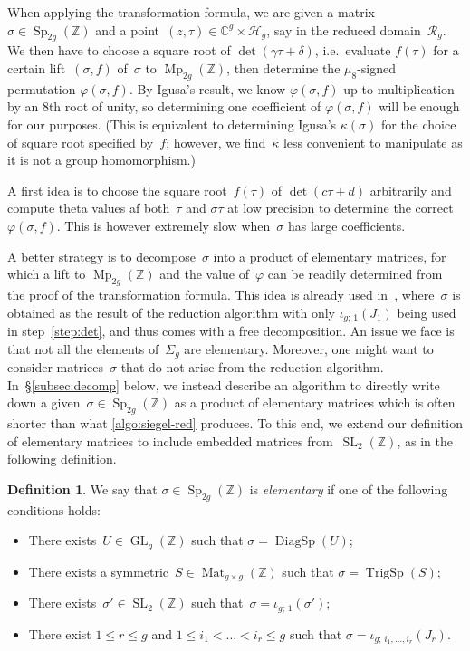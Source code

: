 \documentclass[12pt,oneside]{amsart}
\numberwithin{equation}{section}
\theoremstyle{definition}
\newtheorem{defn}[equation]{Definition}
\newcommand{\Z}{\mathbb{Z}}
\newcommand{\red}{\mathcal{R}}
\newcommand{\C}{\mathbb{C}}
\newcommand{\Half}{\mathcal{H}}
\renewcommand{\phi}{\varphi}
\newcommand{\embedsp}[2]{\iota_{#1;\,#2}}
\DeclareMathOperator{\Sp}{Sp}
\DeclareMathOperator{\SL}{SL}
\DeclareMathOperator{\GL}{GL}
\DeclareMathOperator{\Mp}{Mp}
\DeclareMathOperator{\Mat}{Mat}
\DeclareMathOperator{\TrigSp}{TrigSp}
\DeclareMathOperator{\DiagSp}{DiagSp}
\begin{document}
When applying the transformation formula, we are given a
matrix~$\sigma\in \Sp_{2g}(\Z)$ and a point~$(z,\tau)\in \C^g\times\Half_g$,
say in the reduced domain~$\red_g$. We then have to choose a square root of
$\det(\gamma\tau + \delta)$, i.e.~evaluate $f(\tau)$ for a certain
lift~$(\sigma,f)$ of~$\sigma$ to $\Mp_{2g}(\Z)$, then determine the
$\mu_8$-signed permutation $\phi(\sigma,f)$.  By Igusa's result, we know
$\phi(\sigma,f)$ up to multiplication by an $8$th root of unity, so determining
one coefficient of $\phi(\sigma,f)$ will be enough for our purposes. (This is
equivalent to determining Igusa's $\kappa(\sigma)$ for the choice of square
root specified by~$f$; however, we find~$\kappa$ less convenient to manipulate
as it is not a group homomorphism.)

A first idea is to choose the square root~$f(\tau)$ of $\det(c\tau + d)$
arbitrarily and compute theta values af both~$\tau$ and $\sigma\tau$ at low
precision to determine the correct $\phi(\sigma,f)$. This is however extremely
slow when~$\sigma$ has large coefficients.

A better strategy is to decompose~$\sigma$ into a product of elementary
matrices, for which a lift to $\Mp_{2g}(\Z)$ and the value of~$\phi$ can be
readily determined from the proof of the transformation formula. This idea is
already used in~\cite[§7]{deconinckComputingRiemannTheta2004}, where~$\sigma$
is obtained as the result of the reduction algorithm with only
$\embedsp{g}{1}(J_1)$ being used in step~\eqref{step:det}, and thus comes with
a free decomposition. An issue we face is that not all the elements
of~$\Sigma_g$ are elementary. Moreover, one might want to consider
matrices~$\sigma$ that do not arise from the reduction
algorithm. In~§\ref{subsec:decomp} below, we instead describe an algorithm to
directly write down a given~$\sigma\in \Sp_{2g}(\Z)$ as a product of elementary
matrices which is often shorter than what \cref{algo:siegel-red} produces. To
this end, we extend our definition of elementary matrices to include embedded
matrices from~$\SL_2(\Z)$, as in the following definition.

\begin{defn}
  \label{defn:elementary}
  We say that $\sigma\in \Sp_{2g}(\Z)$ is \emph{elementary} if one of the following conditions holds:
  \begin{itemize}
  \item There exists~$U\in \GL_g(\Z)$ such that $\sigma = \DiagSp(U)$;
  \item There exists a symmetric~$S\in \Mat_{g\times g}(\Z)$ such that $\sigma = \TrigSp(S)$;
  \item There exists~$\sigma'\in \SL_2(\Z)$ such that~$\sigma = \embedsp{g}{1}(\sigma')$;
  \item There exist $1\leq r\leq g$ and $1\leq i_1 < \ldots < i_r \leq g$ such
    that $\sigma = \embedsp{g}{i_1,\ldots,i_r}(J_r)$.
  \end{itemize}
\end{defn}
\end{document}
